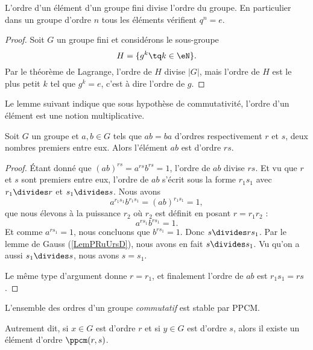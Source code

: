 \begin{corollary}       \label{CorpZItFX}
    L'ordre d'un élément d'un groupe fini divise l'ordre du groupe. En particulier dans un groupe d'ordre \( n\) tous les éléments vérifient \( q^n=e\).
\end{corollary}

\begin{proof}
    Soit \( G\) un groupe fini et considérons le sous-groupe
    \begin{equation}
        H=\{ g^k\tq k\in\eN \}.
    \end{equation}
    Par le théorème de Lagrange, l'ordre de \( H\) divise \( | G |\), mais l'ordre de \( H\) est le plus petit \( k\) tel que \( g^k=e\), c'est à dire l'ordre de \( g\).
\end{proof}

Le lemme suivant indique que sous hypothèse de commutativité, l'ordre d'un élément est une notion multiplicative.
\begin{lemma}    \label{LemyETtdy}
    Soit \( G\) un groupe et \( a,b\in G\) tels que \( ab=ba\) d'ordres respectivement \( r\) et \( s\), deux nombres premiers entre eux. Alors l'élément \( ab\) est d'ordre \( rs\).
\end{lemma}

\begin{proof}
    Étant donné que \( (ab)^{rs}=a^{rs}b^{rs}=1\), l'ordre de \( ab\) divise \( rs\). Et vu que \( r\) et \( s\) sont premiers entre eux, l'ordre de \( ab\) s'écrit sous la forme \( r_1s_1\) avec \( r_1\divides r\) et \( s_1\divides s\). Nous avons
    \begin{equation}
        a^{r_1s_1}b^{r_1s_1}=(ab)^{r_1s_1}=1,
    \end{equation}
    que nous élevons à la puissance \( r_2\) où \( r_2\) est définit en posant \(r=r_1r_2\) :
    \begin{equation}
        a^{rs_1}b^{rs_1}=1.
    \end{equation}
    Et comme \( a^{rs_1}=1\), nous concluons que \( b^{rs_1}=1\). Donc \( s\divides rs_1\). Par le lemme de Gauss (\ref{LemPRuUrsD}), nous avons en fait \( s\divides s_1\). Vu qu'on a aussi \( s_1\divides s\), nous avons \( s=s_1\).

    Le même type d'argument donne \( r=r_1\), et finalement l'ordre de \( ab\) est \( r_1s_1=rs\).
\end{proof}

\begin{lemma}       \label{LemqAUBYn}
    L'ensemble des ordres d'un groupe \emph{commutatif} est stable par PPCM.

    Autrement dit, si \( x\in G\) est d'ordre \( r\) et si \( y\in G\) est d'ordre \( s\), alors il existe un élément d'ordre \( \ppcm(r,s)\).
\end{lemma}

